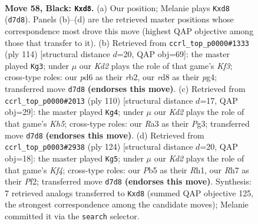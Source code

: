 \documentclass[11pt]{article}
\begin{document}
\clearpage

\begin{figure}[p]\centering
\begin{subfigure}{0.46\textwidth}\centering
\resizebox{\linewidth}{!}{%
\newchessgame
\chessboard[
  setfen={3R4/3k3r/3P4/1p6/4K3/r7/1p1B4/8 b - - 5 58},
  showmover=false,
  pgfstyle=straightmove, color=movearrow, markmove={d7-d8}
]}
\caption{}
\end{subfigure}\hfill
\begin{subfigure}{0.46\textwidth}\centering
\resizebox{\linewidth}{!}{%
\newchessgame
\chessboard[
  setfen={8/5k2/8/7p/6pP/3R1K2/1r6/8 w - - 0 58},
  showmover=false,
  pgfstyle=straightmove, color=movearrow, markmove={f3-g3}
]}
\caption{}
\end{subfigure}
\\[4pt]
\begin{subfigure}{0.46\textwidth}\centering
\resizebox{\linewidth}{!}{%
\newchessgame
\chessboard[
  setfen={8/8/7p/1R5K/8/4k1P1/7r/8 w - - 6 56},
  showmover=false,
  pgfstyle=straightmove, color=movearrow, markmove={h5-g4}
]}
\caption{}
\end{subfigure}\hfill
\begin{subfigure}{0.46\textwidth}\centering
\resizebox{\linewidth}{!}{%
\newchessgame
\chessboard[
  setfen={7k/7P/8/5p2/r4K2/8/5P2/7R w - - 5 63},
  showmover=false,
  pgfstyle=straightmove, color=movearrow, markmove={f4-g5}
]}
\caption{}
\end{subfigure}
\caption{\textbf{Move 58, Black: \texttt{Kxd8}.} (a) Our position; Melanie plays \texttt{Kxd8} (\texttt{d7d8}). Panels (b)--(d) are the retrieved master positions whose correspondence most drove this move (highest QAP objective among those that transfer to it). (b) Retrieved from \texttt{ccrl\_top\_p0000\#1333} (ply 114) [structural distance $d$=20, QAP obj=69]: the master played \texttt{Kg3}; under $\mu$ our \emph{Kd2} plays the role of that game's \emph{Kf3}; cross-type roles: our \emph{p}d6 as their \emph{r}b2, our \emph{r}d8 as their \emph{p}g4; transferred move \texttt{d7d8} \textbf{(endorses this move)}. (c) Retrieved from \texttt{ccrl\_top\_p0000\#2013} (ply 110) [structural distance $d$=17, QAP obj=29]: the master played \texttt{Kg4}; under $\mu$ our \emph{Kd2} plays the role of that game's \emph{Kh5}; cross-type roles: our \emph{R}a3 as their \emph{P}g3; transferred move \texttt{d7d8} \textbf{(endorses this move)}. (d) Retrieved from \texttt{ccrl\_top\_p0003\#2938} (ply 124) [structural distance $d$=20, QAP obj=18]: the master played \texttt{Kg5}; under $\mu$ our \emph{Kd2} plays the role of that game's \emph{Kf4}; cross-type roles: our \emph{P}b5 as their \emph{R}h1, our \emph{R}h7 as their \emph{P}f2; transferred move \texttt{d7d8} \textbf{(endorses this move)}. Synthesis: 7 retrieved analogs transferred to \texttt{Kxd8} (summed QAP objective 125, the strongest correspondence among the candidate moves); Melanie committed it via the \texttt{search} selector.}
\label{fig:thought-m115}
\end{figure}
\end{document}
